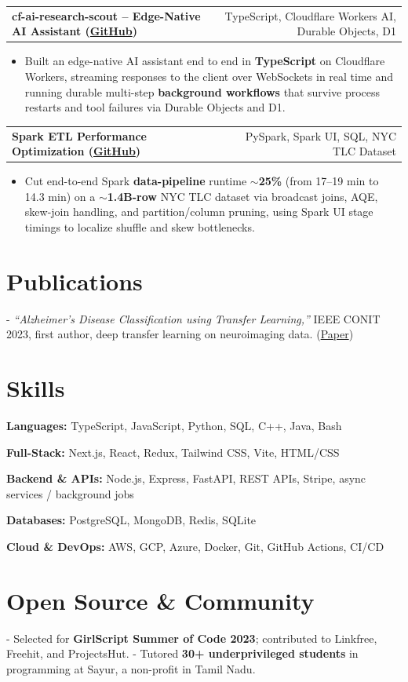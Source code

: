 \documentclass[letterpaper,11pt]{article}
\makeatletter
\newcommand{\projItem}[2]{%
  \vspace{2pt}
  \begin{tabular*}{\textwidth}{@{}l@{\extracolsep{\fill}}r@{}}
    \textbf{#1} & #2 \\
  \end{tabular*}\par\vspace{-3pt}
}
\newcommand{\skillLine}[2]{\textbf{#1:} #2\par\vspace{1.5pt}}
\newcommand{\inlineBlock}[1]{{\setlength{\leftskip}{0.18in}\small #1\par}}
\makeatother
\begin{document}
\projItem{cf-ai-research-scout -- Edge-Native AI Assistant {\normalfont\small(\href{https://github.com/Deva-1903/cf_ai_research_scout}{GitHub})}}{TypeScript, Cloudflare Workers AI, Durable Objects, D1}
\begin{itemize}
  \item Built an edge-native AI assistant end to end in \textbf{TypeScript} on Cloudflare Workers, streaming responses to the client over WebSockets in real time and running durable multi-step \textbf{background workflows} that survive process restarts and tool failures via Durable Objects and D1.
\end{itemize}

\projItem{Spark ETL Performance Optimization {\normalfont\small(\href{https://github.com/Deva-1903/Spark-ETL-Optimization}{GitHub})}}{PySpark, Spark UI, SQL, NYC TLC Dataset}
\begin{itemize}
  \item Cut end-to-end Spark \textbf{data-pipeline} runtime \textbf{$\sim$25\%} (from 17--19 min to 14.3 min) on a \textbf{$\sim$1.4B-row} NYC TLC dataset via broadcast joins, AQE, skew-join handling, and partition/column pruning, using Spark UI stage timings to localize shuffle and skew bottlenecks.
\end{itemize}

\section{Publications}
\vspace{2pt}
\inlineBlock{- \textit{``Alzheimer's Disease Classification using Transfer Learning,''} IEEE CONIT 2023, first author, deep transfer learning on neuroimaging data. {\normalfont\small(\href{https://ieeexplore.ieee.org/document/10205760}{Paper})}}

\section{Skills}
\skillLine{Languages}{TypeScript, JavaScript, Python, SQL, C++, Java, Bash}
\skillLine{Full-Stack}{Next.js, React, Redux, Tailwind CSS, Vite, HTML/CSS}
\skillLine{Backend \& APIs}{Node.js, Express, FastAPI, REST APIs, Stripe, async services / background jobs}
\skillLine{Databases}{PostgreSQL, MongoDB, Redis, SQLite}
\skillLine{Cloud \& DevOps}{AWS, GCP, Azure, Docker, Git, GitHub Actions, CI/CD}

\section{Open Source \& Community}
\inlineBlock{- Selected for \textbf{GirlScript Summer of Code 2023}; contributed to Linkfree, Freehit, and ProjectsHut. - Tutored \textbf{30+ underprivileged students} in programming at Sayur, a non-profit in Tamil Nadu.}
\end{document}
